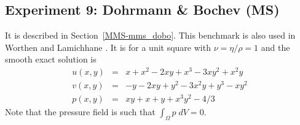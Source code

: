 










\newpage
\subsection*{Experiment 9: Dohrmann \& Bochev (MS)}

It is described in Section~\ref{MMS-mms_dobo}. 
This benchmark is also used in Worthen \etal \cite{wosp14} and Lamichhane \etal \cite{lami17}.
It is for a unit square with $\nu=\eta/\rho=1$ and the smooth exact solution is
\begin{eqnarray}
u(x,y) &=& x+x^2 - 2xy+x^3 - 3xy^2 + x^2y \\
v(x,y) &=& -y-2xy+y^2 -3x^2y + y^3 - xy^2 \\
p(x,y) &=& xy+x+y+x^3y^2 - 4/3
\end{eqnarray}
Note that the pressure field is such that $\int_{\Omega} p \; dV = 0$.

